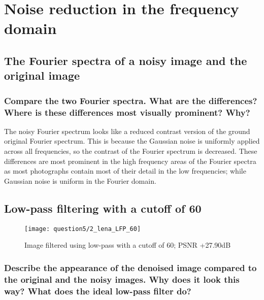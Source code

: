 \section{Noise reduction in the frequency domain}

\subsection{The Fourier spectra of a noisy image and the original image}

\begin{figure}[ht]
\centering
\end{figure}

\subsubsection{Compare the two Fourier spectra. What are the differences? Where is these differences most visually
prominent? Why?}

The noisy Fourier spectrum looks like a reduced contrast version of the ground original Fourier spectrum. This is because the Gaussian noise is uniformly applied across all frequencies, so the contrast of the Fourier spectrum is decreased. These differences are most prominent in the high frequency areas of the Fourier spectra as most photographs contain most of their detail in the low frequencies; while Gaussian noise is uniform in the Fourier domain.


\subsection{Low-pass filtering with a cutoff of 60}
\begin{figure}[ht]
\centering
	\texttt{[image: question5/2\_lena\_LFP\_60]}
	\caption{Image filtered using low-pass with a cutoff of 60; PSNR +27.90dB}
\end{figure}

\subsubsection{Describe the appearance of the denoised image compared to the original and the noisy images. Why does it look this way? What does the ideal low-pass filter do?}

